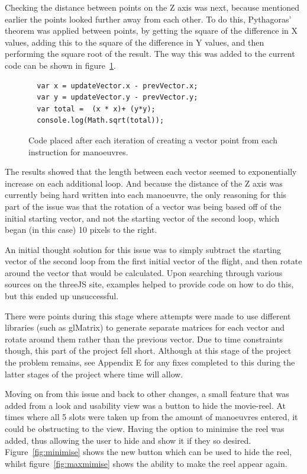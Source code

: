 Checking the distance between points on the Z axis was next, because mentioned earlier the points looked further away from each other. To do this, Pythagoras' theorem was applied between points, by getting the square of the difference in X values, adding this to the square of the difference in Y values, and then performing the square root of the result. The way this was added to the current code can be shown in figure~\ref{code:pythagoras}.

\begin{figure}[h!]
  \begin{lstlisting}
  var x = updateVector.x - prevVector.x;
  var y = updateVector.y - prevVector.y;
  var total =  (x * x)+ (y*y);
  console.log(Math.sqrt(total));
  \end{lstlisting}
  \caption{Code placed after each iteration of creating a vector point from each instruction for manoeuvres.}
  \label{code:pythagoras}
\end{figure}

The results showed that the length between each vector seemed to exponentially increase on each additional loop. And because the distance of the Z axis was currently being hard written into each manoeuvre, the only reasoning for this part of the issue was that the rotation of a vector was being based off of the initial starting vector, and not the starting vector of the second loop, which began (in this case) 10 pixels to the right. 

An initial thought solution for this issue was to simply subtract the starting vector of the second loop from the first initial vector of the flight, and then rotate around the vector that would be calculated. Upon searching through various sources on the threeJS site, examples helped to provide code on how to do this, but this ended up unsuccessful.

There were points during this stage where attempts were made to use different libraries (such as glMatrix) to generate separate matrices for each vector and rotate around them rather than the previous vector. Due to time constraints though, this part of the project fell short. Although at this stage of the project the problem remains, see Appendix E for any fixes completed to this during the latter stages of the project where time will allow.

Moving on from this issue and back to other changes, a small feature that was added from a look and usability view was a button to hide the movie-reel. At times where all 5 slots were taken up from the amount of manoeuvres entered, it could be obstructing to the view. Having the option to minimise the reel was added, thus allowing the user to hide and show it if they so desired. Figure~\ref{fig:minimise} shows the new button which can be used to hide the reel, whilst figure~\ref{fig:maxmimise} shows the ability to make the reel appear again.

